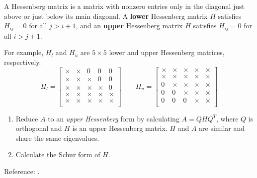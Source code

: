 \documentclass{article}
\begin{document}
\begin{tcolorbox}[title={Hessenberg matrix},colback=blue!5!white,colframe=blue!75!black,parbox=false]
	A Hessenberg matrix is a matrix with nonzero entries only in the diagonal just above or just below its main diagonal. A \textbf{lower} Hessenberg matrix $H$ satisfies $H_{ij}=0$ for all $j>i+1$, and an \textbf{upper} Hessenberg matrix $H$ satisfies $H_{ij}=0$ for all $i>j+1$.

	For example, $H_l$ and $H_u$ are $5\times 5$ lower and upper Hessenberg matrices, respectively.
	\begin{equation*}
	    H_l=\begin{bmatrix}
			\times & \times & 0 & 0 & 0 \\
			\times & \times & \times & 0 & 0 \\
			\times & \times & \times & \times & 0 \\
			\times & \times & \times & \times & \times \\
			\times & \times & \times & \times & \times \\
	    \end{bmatrix}
		\qquad
	    H_u=\begin{bmatrix}
			\times & \times & \times & \times & \times \\
			\times & \times & \times & \times & \times \\
			0 & \times & \times & \times & \times \\
			0 & 0 & \times & \times & \times \\
			0 & 0 & 0 & \times & \times \\
	    \end{bmatrix}
	\end{equation*}
\end{tcolorbox}

\begin{tcolorbox}[title={\textsc{Lapack} Algorithm},colback=red!5!white,colframe=red!75!black,parbox=false]
	\begin{enumerate}
		\item Reduce $A$ to an \textit{upper Hessenberg} form by calculating $A=QHQ^T$, where $Q$ is orthogonal and $H$ is an upper Hessenberg matrix. $H$ and $A$ are similar and share the same eigenvalues.
		\item Calculate the Schur form of $H$.
	\end{enumerate}
	Reference: \cite{lapack:eig}.
\end{tcolorbox}
\end{document}
